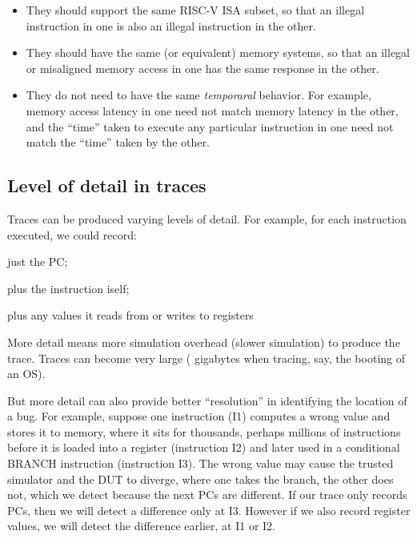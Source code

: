 \begin{itemize}
 \item They should support the same RISC-V ISA subset, so that an
       illegal instruction in one is also an illegal instruction in the
       other.  

 \item They should have the same (or equivalent) memory systems, so
       that an illegal or misaligned memory access in one has the same
       response in the other.

 \item They do not need to have the same \emph{temporaral} behavior.
       For example, memory access latency in one need not match memory
       latency in the other, and the ``time'' taken to execute any
       particular instruction in one need not match the ``time'' taken
       by the other.

\end{itemize}


\subsection{Level of detail in traces}

Traces can be produced varying levels of detail.  For example, for
each instruction executed, we could record:

\begin{tightlist}
 \item just the PC;
 \item plus the instruction iself;
 \item plus any values it reads from or writes to registers
\end{tightlist}

More detail means more simulation overhead (slower simulation) to
produce the trace.  Traces can become very large ({\eg} gigabytes when
tracing, say, the booting of an OS).

But more detail can also provide better ``resolution'' in identifying
the location of a bug.  For example, suppose one instruction (I1)
computes a wrong value and stores it to memory, where it sits for
thousands, perhaps millions of instructions before it is loaded into a
register (instruction I2) and later used in a conditional BRANCH
instruction (instruction I3).  The wrong value may cause the trusted
simulator and the DUT to diverge, where one takes the branch, the
other does not, which we detect because the next PCs are different.
If our trace only records PCs, then we will detect a difference only
at I3. However if we also record register values, we will detect the
difference earlier, at I1 or I2.

